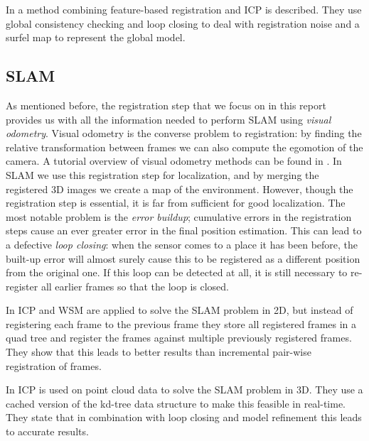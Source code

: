 \documentclass[a4paper]{article}
\begin{document}
In \cite{henry2010rgb} a method combining feature-based registration and \ac{ICP} is described. They use global consistency checking and loop closing to deal with registration noise and a surfel map to represent the global model.

\subsection{\acf{SLAM}}


As mentioned before, the registration step that we focus on in this report provides us with all the information needed to perform \ac{SLAM} using \emph{visual odometry}. Visual odometry is the converse problem to registration: by finding the relative transformation between frames we can also compute the egomotion of the camera. A tutorial overview of visual odometry methods can be found in \cite{scaramuzzavisual,fraundorfervisual}. In \ac{SLAM} we use this registration step for localization, and by merging the registered 3D images we create a map of the environment. However, though the registration step is essential, it is far from sufficient for good localization. The most notable problem is the \emph{error buildup}; cumulative errors in the registration steps cause an ever greater error in the final position estimation. This can lead to a defective \emph{loop closing}: when the sensor comes to a place it has been before, the built-up error will almost surely cause this to be registered as a different position from the original one. If this loop can be detected at all, it is still necessary to re-register all earlier frames so that the loop is closed. 


In \cite{slamet2008boosting} \ac{ICP} and \ac{WSM} are applied to solve the \ac{SLAM} problem in 2D, but instead of registering each frame to the previous frame they store all registered frames in a quad tree and register the frames against multiple previously registered frames. They show that this leads to better results than incremental pair-wise registration of frames.

In \cite{nuchter20076d} \ac{ICP} is used on point cloud data to solve the \ac{SLAM} problem in 3D. They use a cached version of the kd-tree data structure to make this feasible in real-time. They state that in combination with loop closing and model refinement this leads to accurate results.
\end{document}
